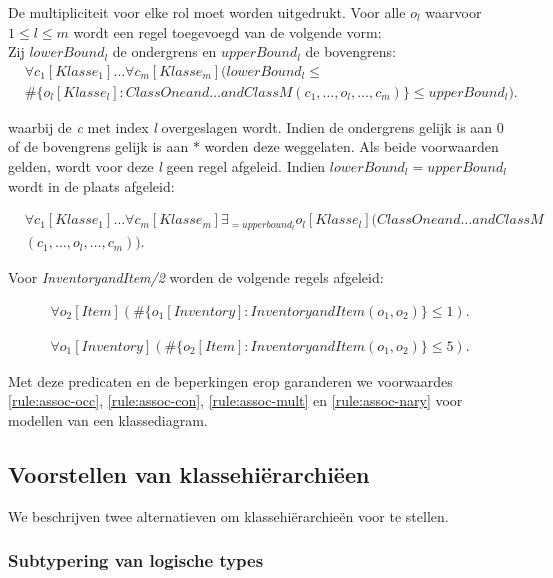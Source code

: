 De multipliciteit voor elke rol moet worden uitgedrukt. Voor alle $o_l$ waarvoor $1 \leq l \leq m$ wordt een regel toegevoegd van de volgende vorm:\\

Zij $lowerBound_l$ de ondergrens en $upperBound_l$ de bovengrens:
\begin{align*}
	&\forall{c_1}[Klasse_1]\ldots\forall{c_m}[Klasse_m](lowerBound_l \leq
	\\
	&\#\{o_l[Klasse_l] : ClassOneand\ldots{}andClassM(c_1,\ldots,o_l,\ldots,c_m)\} \leq upperBound_l).
\end{align*}
	
waarbij de \textit{c} met index \textit{l} overgeslagen wordt. Indien de ondergrens gelijk is aan $0$ of de bovengrens gelijk is aan $*$ worden deze weggelaten. Als beide voorwaarden gelden, wordt voor deze \textit{l} geen regel afgeleid. Indien $lowerBound_l = upperBound_l$ wordt in de plaats afgeleid:
	
	\begin{align*}
	&\forall{c_1}[Klasse_1]\ldots\forall{c_m}[Klasse_m] \exists_{=upperbound_l}o_l[Klasse_l](ClassOneand\ldots{}andClassM\\&(c_1,\ldots,o_l,\ldots,c_m)).
	\end{align*}
	
	Voor \textit{InventoryandItem/2} worden de volgende regels afgeleid:
	
\begin{align*}
		\forall{o_2}[Item](\#\{o_1[Inventory]: InventoryandItem(o_1,o_2)\} \leq 1).
\end{align*} 
		
\begin{align*}
		\forall{o_1}[Inventory](\#\{o_2[Item]: InventoryandItem(o_1,o_2)\} \leq 5).
\end{align*}

Met deze predicaten en de beperkingen erop garanderen we voorwaardes \ref{rule:assoc-occ}, \ref{rule:assoc-con}, \ref{rule:assoc-mult} en \ref{rule:assoc-nary} voor modellen van een klassediagram.

\subsection{Voorstellen van klassehi\"erarchi\"een}\label{sec:hierarchies}
We beschrijven twee alternatieven om klassehi\"erarchie\"en voor te stellen.

\subsubsection{Subtypering van logische types}

